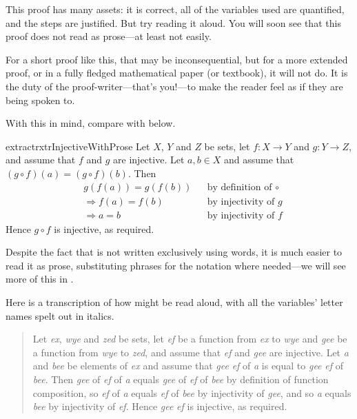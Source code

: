 This proof has many assets: it is correct, all of the variables used are quantified, and the steps are justified. But try reading it aloud. You will soon see that this proof does not read as prose---at least not easily.

For a short proof like this, that may be inconsequential, but for a more extended proof, or in a fully fledged mathematical paper (or textbook), it will not do. It is the duty of the proof-writer---that's you!---to make the reader feel as if they are being spoken to.

With this in mind, compare  with  below.

\begin{restatable}{extract}{rxtrInjectiveWithProse}
\label{xtrInjectiveWithProse}
Let $X$, $Y$ and $Z$ be sets, let $f : X \to Y$ and $g : Y \to Z$, and assume that $f$ and $g$ are injective. Let $a,b \in X$ and assume that $(g \circ f)(a) = (g \circ f)(b)$. Then
\begin{align*}
& g(f(a)) = g(f(b)) && \text{by definition of $\circ$} \\
& \Rightarrow f(a) = f(b) && \text{by injectivity of $g$} \\
& \Rightarrow a = b && \text{by injectivity of $f$}
\end{align*}
Hence $g \circ f$ is injective, as required.
\end{restatable}

Despite the fact that  is not written exclusively using words, it is much easier to read it as prose, substituting phrases for the notation where needed---we will see more of this in .

Here is a transcription of how  might be read aloud, with all the variables' letter names spelt out in italics.

\begin{quote}
Let \textit{ex}, \textit{wye} and \textit{zed} be sets, let \textit{ef} be a function from \textit{ex} to \textit{wye} and \textit{gee} be a function from \textit{wye} to \textit{zed}, and assume that \textit{ef} and \textit{gee} are injective. Let \textit{a} and \textit{bee} be elements of \textit{ex} and assume that \textit{gee} \textit{ef} of \textit{a} is equal to \textit{gee} \textit{ef} of \textit{bee}. Then \textit{gee} of \textit{ef} of \textit{a} equals \textit{gee} of \textit{ef} of \textit{bee} by definition of function composition, so \textit{ef} of \textit{a} equals \textit{ef} of \textit{bee} by injectivity of \textit{gee}, and so \textit{a} equals \textit{bee} by injectivity of \textit{ef}. Hence \textit{gee} \textit{ef} is injective, as required.
\end{quote}

